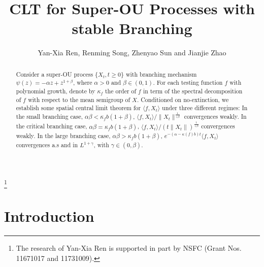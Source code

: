 \documentclass[12pt,oneside,english]{amsart}
\theoremstyle{plain}
\theoremstyle{definition}
\numberwithin{equation}{section}
\begin{document}
\title
    [CLT for Super-OU processes]
    {CLT for Super-OU Processes with stable Branching}
\author
    [Y.-X. Ren, R. Song, Z. Sun and J. Zhao]
    {Yan-Xia Ren, Renming Song, Zhenyao Sun and Jianjie Zhao}
\address
    {Yan-Xia Ren\\
    School of Mathematical Sciences\\
    Peking University\\
    Beijing, P. R. China, 100871}
\thanks{The research of Yan-Xia Ren is supported in part by NSFC (Grant Nos. 11671017  and 11731009).}
\address
    {Zhenyao Sun\\
    School of Mathematical Sciences\\
    Peking University\\
    Beijing, P. R. China, 100871}
\address
    {Jianjie Zhao\\
    School of Mathematical Sciences\\
    Peking University\\
    Beijing, P. R. China, 100871}
\maketitle
\begin{abstract}
    Consider a super-OU process $\{X_t, t\geq 0\}$ with branching mechanism $\psi(z)=-\alpha z +z^{1+\beta}$, where $\alpha >0$ and $\beta\in (0,1)$. For each testing function $f$ with polynomial growth, denote by $\kappa_f$ the order of $f$ in term of the spectral decomposition of $f$ with respect to the mean semigroup of $X$. Conditioned on no-extinction, we establish some spatial central limit theorem for $\langle f, X_t \rangle$ under three different regimes: In the small branching case, $\alpha\beta< \kappa_f b(1+\beta)$, $\langle f,X_t\rangle/\|X_t\|^{\frac{1}{+\beta}}$ convergences weakly. In the critical branching case, $\alpha\beta= \kappa_f b(1+\beta)$,  $\langle f,X_t\rangle/(t\|X_t\|)^{\frac{1}{+\beta}}$ convergences weakly. In the large branching case,  $\alpha\beta> \kappa_f b(1+\beta)$, $e^{-(\alpha-\kappa(f)b)t}\langle f,X_t\rangle$ convergences a.s and in $L^{1+\gamma}$, with $\gamma \in (0,\beta)$.
\end{abstract}
\section{Introduction}
\end{document}
